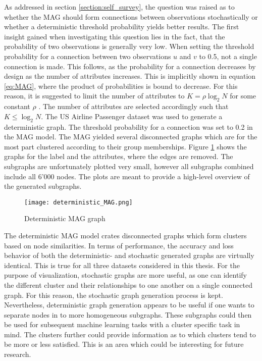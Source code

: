   As addressed in section \ref{section:self_survey}, the question was raised 
  as to whether the MAG should form connections between observations
  stochastically or whether a deterministic threshold probability yields better 
  results. The first insight gained when investigating this question lies in 
  the fact, that the probability of two observations is generally very low. 
  When setting the threshold probability for a connection between two 
  observations $u$ and $v$ to 0.5, not a single connection is made. This
  follows, as the probability for a connection decreases by design as the number 
  of attributes increases. This is implicitly shown in equation \ref{eq:MAG}, 
  where the product of probabilities is bound to decrease. For this reason, it 
  is suggested to limit the number of attributes to $K=\rho\log_{2}N$ for some 
  constant $\rho$ \citep[p. 122]{kim2012multiplicative}. The number of 
  attributes are selected accordingly such that $K\leqslant\log_{2} N$. The 
  US Airline Passenger dataset was used to generate a deterministic graph. The 
  threshold probability for a connection was set to 0.2 in the MAG model. The 
  MAG yielded several disconnected graphs which are for the most part 
  clustered according to their group memberships. Figure \ref{fig:det_MAG} 
  shows the graphs for the label and the attributes, where the edges are 
  removed. The subgraphs are unfortunately plotted very small, however all 
  subgraphs combined include all 6'000 nodes. The plots are meant to provide a 
  high-level overview of the generated subgraphs. 

  \begin{figure}[h]
		\centering
		\texttt{[image: deterministic\_MAG.png]}
		\caption{Deterministic MAG graph}
        \label{fig:det_MAG}
  \end{figure}

  \noindent The deterministic MAG model crates disconnected graphs which form 
  clusters based on node similarities. In terms of performance, the accuracy 
  and loss behavior of both the deterministic- and stochastic generated graphs 
  are virtually identical. This is true for all three datasets considered in 
  this thesis. For the purpose of visualization, stochastic graphs are more 
  useful, as one can identify the different cluster and their relationships to 
  one another on a single connected graph. For this reason, the stochastic graph 
  generation process is kept. Nevertheless, deterministic graph generation 
  appears to be useful if one wants to separate nodes in to more homogeneous 
  subgraphs. These subgraphs could then be used for subsequent machine learning 
  tasks with a cluster specific task in mind. The clusters further could 
  provide information as to which clusters tend to be more or less satisfied. 
  This is an area which could be interesting for future research.
  
